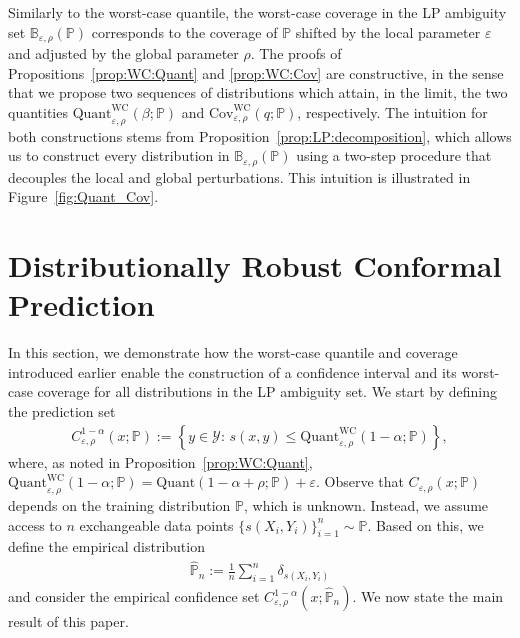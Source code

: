 \documentclass[11pt,a4paper]{article}
\begin{document}
Similarly to the worst-case quantile, the worst-case coverage in the LP ambiguity set $\mathbb{B}_{\varepsilon, \rho}(\mathbb{P})$ corresponds to the coverage of $\mathbb{P}$ shifted by the local parameter $\varepsilon$ and adjusted by the global parameter $\rho$. The proofs of Propositions~\ref{prop:WC:Quant} and \ref{prop:WC:Cov} are constructive, in the sense that we propose two sequences of distributions which attain, in the limit, the two quantities $\text{Quant}_{\varepsilon,\rho}^{\text{WC}}(\beta;\mathbb P)$ and $\text{Cov}_{\varepsilon,\rho}^{\text{WC}}(q;\mathbb P)$, respectively. The intuition for both constructions stems from Proposition~\ref{prop:LP:decomposition}, which allows us to construct every distribution in $\mathbb{B}_{\varepsilon, \rho}(\mathbb{P})$ using a two-step procedure that decouples the local and global perturbations. This intuition is illustrated in Figure~\ref{fig:Quant_Cov}.











\section{Distributionally Robust Conformal Prediction}
\label{sec:robust:conformal}

In this section, we demonstrate how the worst-case quantile and coverage introduced earlier enable the construction of a confidence interval and its worst-case coverage for all distributions in the LP ambiguity set. We start by defining the prediction set
\begin{align}
\label{eq:WC:prediction:set}
    C_{\varepsilon,\rho}^{1-\alpha}(x;\mathbb P) := \left\{y\in\mathcal{Y}:\,s(x,y)\leq \text{Quant}_{\varepsilon,\rho}^{\text{WC}}(1 - \alpha;\mathbb P) \right\},
\end{align}
where, as noted in Proposition~\ref{prop:WC:Quant}, $\text{Quant}_{\varepsilon,\rho}^{\text{WC}}(1 - \alpha;\mathbb P) = \text{Quant}(1 - \alpha +\rho; \mathbb P) + \varepsilon$. Observe that $C_{\varepsilon,\rho}(x;\mathbb P)$ depends on the training distribution $\mathbb P$, which is unknown. Instead, we assume access to $n$ exchangeable data points $\{s(X_i,Y_i)\}_{i=1}^n \sim \mathbb P$. Based on this, we define the empirical distribution
\begin{align*}
    \widehat{\mathbb P}_n := \frac{1}{n} \sum_{i=1}^n \delta_{s(X_i,Y_i)}
\end{align*}
and consider the empirical confidence set $C_{\varepsilon,\rho}^{1-\alpha}(x;\widehat{\mathbb P}_n)$. We now state the main result of this paper.
\end{document}

